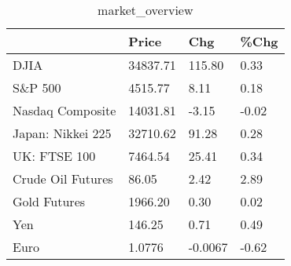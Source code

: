 \documentclass{article}%
\begin{document}
%


\begin{table}[htbp]%
\caption{market\_overview}%
\centering%
\begin{adjustbox}{width=1\textwidth}%
\begin{tabular}{llll}
\toprule
                  &    Price &     Chg &  \%Chg \\
\midrule
             DJIA & 34837.71 &  115.80 &  0.33 \\
          S\&P 500 &  4515.77 &    8.11 &  0.18 \\
 Nasdaq Composite & 14031.81 &   -3.15 & -0.02 \\
Japan: Nikkei 225 & 32710.62 &   91.28 &  0.28 \\
     UK: FTSE 100 &  7464.54 &   25.41 &  0.34 \\
Crude Oil Futures &    86.05 &    2.42 &  2.89 \\
     Gold Futures &  1966.20 &    0.30 &  0.02 \\
              Yen &   146.25 &    0.71 &  0.49 \\
             Euro &   1.0776 & -0.0067 & -0.62 \\
\bottomrule
\end{tabular}
%
\end{adjustbox}%
\end{table}

%
\end{document}
